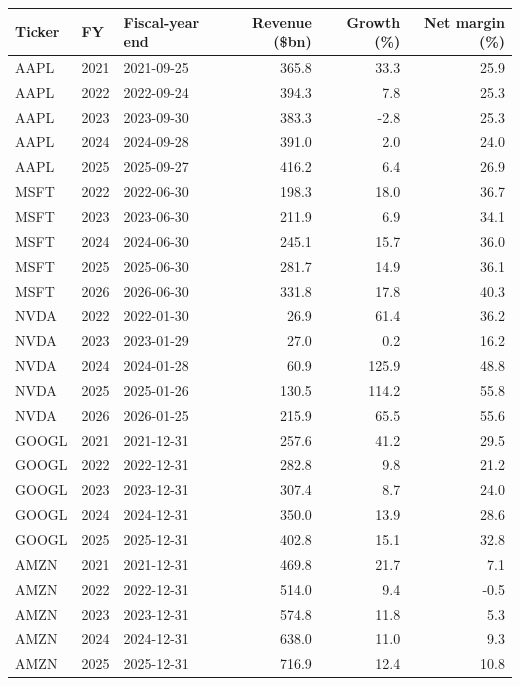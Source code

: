 \begin{tabular}{@{}lllrrr@{}}
\toprule
Ticker & FY & Fiscal-year end & Revenue (\$bn) & Growth (\%) & Net margin (\%) \\
\midrule
AAPL & 2021 & 2021-09-25 & 365.8 & 33.3 & 25.9 \\
AAPL & 2022 & 2022-09-24 & 394.3 & 7.8 & 25.3 \\
AAPL & 2023 & 2023-09-30 & 383.3 & -2.8 & 25.3 \\
AAPL & 2024 & 2024-09-28 & 391.0 & 2.0 & 24.0 \\
AAPL & 2025 & 2025-09-27 & 416.2 & 6.4 & 26.9 \\
\addlinespace[2pt]
MSFT & 2022 & 2022-06-30 & 198.3 & 18.0 & 36.7 \\
MSFT & 2023 & 2023-06-30 & 211.9 & 6.9 & 34.1 \\
MSFT & 2024 & 2024-06-30 & 245.1 & 15.7 & 36.0 \\
MSFT & 2025 & 2025-06-30 & 281.7 & 14.9 & 36.1 \\
MSFT & 2026 & 2026-06-30 & 331.8 & 17.8 & 40.3 \\
\addlinespace[2pt]
NVDA & 2022 & 2022-01-30 & 26.9 & 61.4 & 36.2 \\
NVDA & 2023 & 2023-01-29 & 27.0 & 0.2 & 16.2 \\
NVDA & 2024 & 2024-01-28 & 60.9 & 125.9 & 48.8 \\
NVDA & 2025 & 2025-01-26 & 130.5 & 114.2 & 55.8 \\
NVDA & 2026 & 2026-01-25 & 215.9 & 65.5 & 55.6 \\
\addlinespace[2pt]
GOOGL & 2021 & 2021-12-31 & 257.6 & 41.2 & 29.5 \\
GOOGL & 2022 & 2022-12-31 & 282.8 & 9.8 & 21.2 \\
GOOGL & 2023 & 2023-12-31 & 307.4 & 8.7 & 24.0 \\
GOOGL & 2024 & 2024-12-31 & 350.0 & 13.9 & 28.6 \\
GOOGL & 2025 & 2025-12-31 & 402.8 & 15.1 & 32.8 \\
\addlinespace[2pt]
AMZN & 2021 & 2021-12-31 & 469.8 & 21.7 & 7.1 \\
AMZN & 2022 & 2022-12-31 & 514.0 & 9.4 & -0.5 \\
AMZN & 2023 & 2023-12-31 & 574.8 & 11.8 & 5.3 \\
AMZN & 2024 & 2024-12-31 & 638.0 & 11.0 & 9.3 \\
AMZN & 2025 & 2025-12-31 & 716.9 & 12.4 & 10.8 \\
\bottomrule
\end{tabular}
